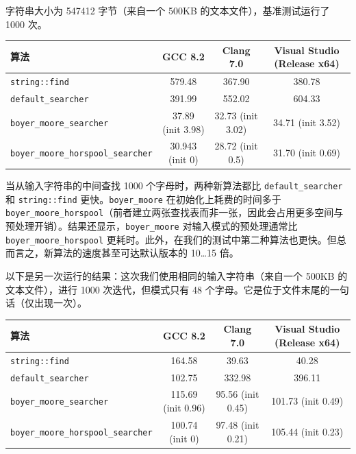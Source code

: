 字符串大小为 547412 字节（来自一个 500KB 的文本文件），基准测试运行了 1000 次。

\begin{table}[H]
\centering
\begin{tabularx}{\textwidth}{X c c c}
\toprule
算法 & GCC 8.2 & Clang 7.0 & Visual Studio (Release x64) \\
\midrule
\texttt{string::find} & 579.48 & 367.90 & 380.78 \\
\texttt{default\_searcher} & 391.99 & 552.02 & 604.33 \\
\texttt{boyer\_moore\_searcher} & 37.89 (init 3.98) & 32.73 (init 3.02) & 34.71 (init 3.52) \\
\texttt{boyer\_moore\_horspool\_searcher} & 30.943 (init 0) & 28.72 (init 0.5) & 31.70 (init 0.69) \\
\bottomrule
\end{tabularx}
\end{table}


当从输入字符串的中间查找 1000 个字母时，两种新算法都比 \texttt{default\_searcher} 和 \texttt{string::find} 更快。\texttt{boyer\_moore} 在初始化上耗费的时间多于 \texttt{boyer\_moore\_horspool}（前者建立两张查找表而非一张，因此会占用更多空间与预处理开销）。结果还显示，\texttt{boyer\_moore} 对输入模式的预处理通常比 \texttt{boyer\_moore\_horspool} 更耗时。此外，在我们的测试中第二种算法也更快。但总而言之，新算法的速度甚至可达默认版本的 10…15 倍。

以下是另一次运行的结果：这次我们使用相同的输入字符串（来自一个 500KB 的文本文件），进行 1000 次迭代，但模式只有 48 个字母。它是位于文件末尾的一句话（仅出现一次）。

\begin{table}[H]
\centering
\begin{tabularx}{\textwidth}{X c c c}
\toprule
算法 & GCC 8.2 & Clang 7.0 & Visual Studio (Release x64) \\
\midrule
\texttt{string::find} & 164.58 & 39.63 & 40.28 \\
\texttt{default\_searcher} & 102.75 & 332.98 & 396.11 \\
\texttt{boyer\_moore\_searcher} & 115.69 (init 0.96) & 95.56 (init 0.45) & 101.73 (init 0.49) \\
\texttt{boyer\_moore\_horspool\_searcher} & 100.74 (init 0) & 97.48 (init 0.21) & 105.44 (init 0.23) \\
\bottomrule
\end{tabularx}
\end{table}

